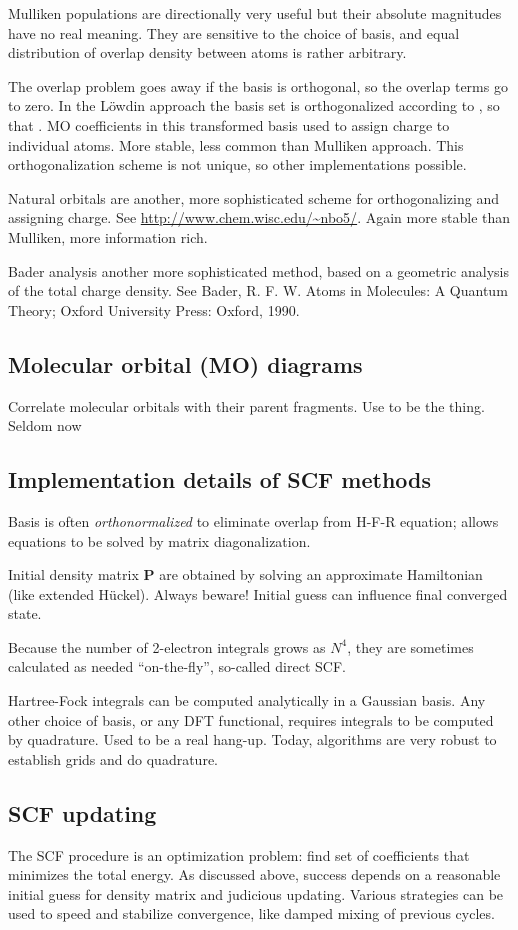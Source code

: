 \documentclass[11pt]{article}
\begin{document}
Mulliken populations are directionally very useful but their absolute magnitudes have no real meaning.  They are sensitive to the choice of basis, and equal distribution of overlap density between atoms is rather arbitrary.

The overlap problem goes away if the basis is orthogonal, so the overlap terms go to zero.  In the Löwdin approach the basis set is orthogonalized according to  , so that  .  MO coefficients in this transformed basis used to assign charge to individual atoms.  More stable, less common than Mulliken approach.  This orthogonalization scheme is not unique, so other implementations possible.

Natural orbitals are another, more sophisticated scheme for orthogonalizing and assigning charge.  See \url{http://www.chem.wisc.edu/\~nbo5/}.  Again more stable than Mulliken, more information rich.

Bader analysis another more sophisticated method, based on a geometric analysis of the total charge density.  See Bader, R. F. W. Atoms in Molecules: A Quantum Theory; Oxford University Press: Oxford, 1990.
\subsection{Molecular orbital (MO) diagrams}
\label{sec:org8b896fd}
Correlate molecular orbitals with their parent fragments.  Use to be the thing.  Seldom now
\subsection{Implementation details of SCF methods}
\label{sec:org785da82}
Basis is often \emph{orthonormalized} to eliminate overlap from H-F-R equation; allows equations to be solved by matrix diagonalization.

Initial density matrix \(\mathbf{P}\) are obtained by solving an approximate Hamiltonian (like extended H\"{u}ckel). Always beware! Initial guess can influence final converged state.

Because the number of 2-electron integrals grows as \(N^4\), they are sometimes calculated as needed ``on-the-fly'', so-called direct SCF.

Hartree-Fock integrals can be computed analytically in a Gaussian basis.  Any other choice of basis, or any DFT functional, requires integrals to be computed by quadrature. Used to be a real hang-up.  Today, algorithms are very robust to establish grids and do quadrature.
\subsection{SCF updating}
\label{sec:org6cb83aa}
The SCF procedure is an optimization problem: find set of coefficients that minimizes the total energy. As discussed above, success depends on a reasonable initial guess for density matrix and judicious updating. Various strategies can be used to speed and stabilize convergence, like damped mixing of previous cycles.
\end{document}
